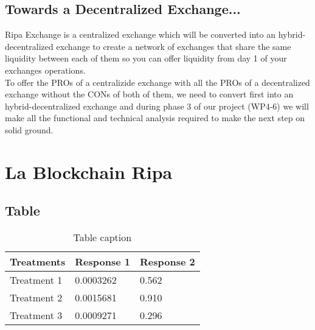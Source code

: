\documentclass[11pt,fleqn,oneside]{book} %
\begin{document}
\section{Towards a Decentralized Exchange...}
Ripa Exchange is a centralized exchange which will be converted into an hybrid-decentralized exchange to create a network of exchanges
that share the same liquidity between each of them so you can offer liquidity from day 1 of your exchanges operations.\\

To offer the PROs of a centralizide exchange with all the PROs of a decentralized exchange without the CONs of both of them, 
we need to convert first into an hybrid-decentralized exchange and during phase 3 of our project (WP4-6) we will make all the 
functional and technical analysis required to make the next step on solid ground.





\chapter{La Blockchain Ripa}

\section{Table}

\begin{table}[h]
	\centering
	\begin{tabular}{l l l}
		\toprule
		\textbf{Treatments} & \textbf{Response 1} & \textbf{Response 2} \\
		\midrule
		Treatment 1         & 0.0003262           & 0.562               \\
		Treatment 2         & 0.0015681           & 0.910               \\
		Treatment 3         & 0.0009271           & 0.296               \\
		\bottomrule
	\end{tabular}
	\caption{Table caption}
\end{table}
\end{document}
